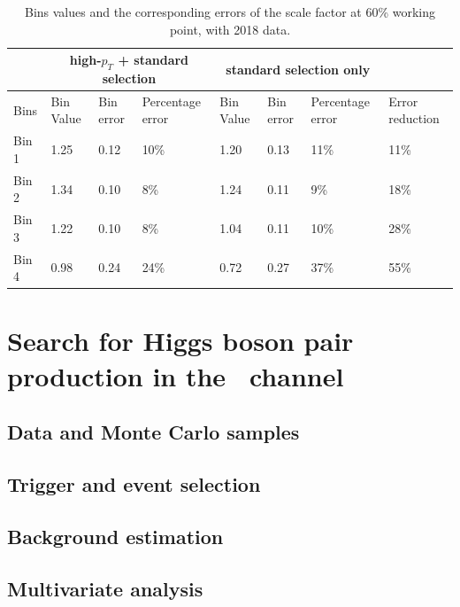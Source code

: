 \documentclass[letterpaper,12pt]{article}
\begin{document}
 \begin{table}[ht]
 \begin{centering}
 \begin{tabular}{|p{2.5em}||p{2.5em}|p{2.5em}|p{5em}||p{2.5em}|p{2.5em}|p{5em}||p{5em}|}
          \hline
          & \multicolumn{3}{|c||}{high-$p_{T}$ + standard selection} & \multicolumn{3}{|c||}{standard selection only} & \\  \hline\hline
          Bins& Bin Value &Bin error&Percentage error&Bin Value &Bin error&Percentage error & Error reduction\\ \hline
          Bin 1 & 1.25 & 0.12 & 10\% &1.20 & 0.13 & 11\% & 11\% \\ \hline
          Bin 2 & 1.34 & 0.10 & 8\% & 1.24 & 0.11 & 9\% & 18\% \\ \hline
          Bin 3 & 1.22 & 0.10 & 8\% & 1.04 & 0.11 & 10\% & 28\% \\ \hline
          Bin 4 & 0.98 & 0.24 & 24\% & 0.72 & 0.27 & 37\% & 55\% \\ \hline
          
 
 \end{tabular} 
 \caption{Bins values and the corresponding errors of the scale factor at 60\% working point, with 2018 data.}
 \end{centering}
 \label{tab:limit}
 \end{table}

\fi

\newpage




\section{Search for Higgs boson pair production in the \bbtt\ channel}
\label{sec:search for dihiggs}
\subsection{Data and Monte Carlo samples}
\subsection{Trigger and event selection}
\subsection{Background estimation}
\subsection{Multivariate analysis}
\end{document}
